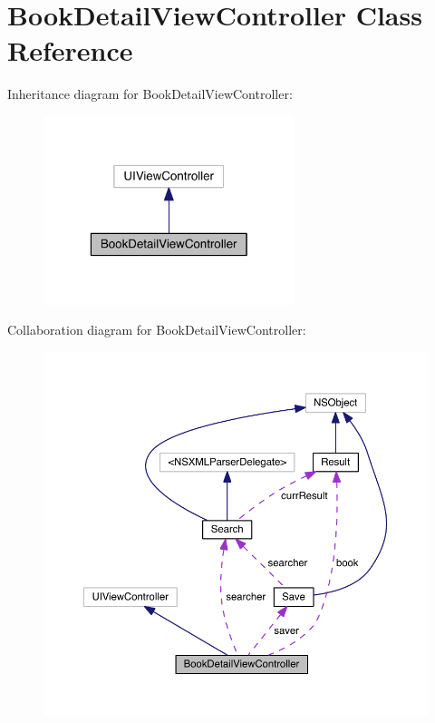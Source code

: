 \section{Book\+Detail\+View\+Controller Class Reference}
\label{interface_book_detail_view_controller}


Inheritance diagram for Book\+Detail\+View\+Controller\+:
\nopagebreak
\begin{figure}[H]
\begin{center}
\leavevmode
\includegraphics[width=208pt]{interface_book_detail_view_controller__inherit__graph}
\end{center}
\end{figure}


Collaboration diagram for Book\+Detail\+View\+Controller\+:
\nopagebreak
\begin{figure}[H]
\begin{center}
\leavevmode
\includegraphics[width=350pt]{interface_book_detail_view_controller__coll__graph}
\end{center}
\end{figure}
